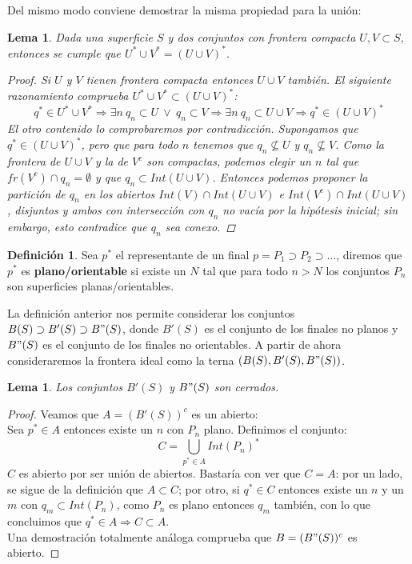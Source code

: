 \documentclass[a4paper,11pt,spanish, twoside, leqno]{tfg-uam}
\newtheorem{lema}[teor]{Lema}
\theoremstyle{definition}
\newtheorem{defin}[teor]{Definici\'on}
\begin{document}
Del mismo modo conviene demostrar la misma propiedad para la unión:
\begin{lema}
Dada una superficie $S$ y dos conjuntos  con frontera compacta $U,V \subset S$, entonces se cumple que $U^*\cup V^* = (U \cup V)^* $.
\begin{proof}
Si $U$ y $V$ tienen frontera compacta entonces $U\cup V$ también. El siguiente razonamiento comprueba $U^*\cup V^* \subset (U \cup V)^* $:
\[
q^* \in U^*\cup V^* \Rightarrow 
\exists n \: q_n \subset U \: \vee \: q_n \subset V \Rightarrow
\exists n \: q_n \subset U \cup V \Rightarrow
q^* \in (U \cup V)^*
\]
El otro contenido lo comprobaremos por contradicción. Supongamos que $q^* \in (U \cup V)^*$, pero que para todo $n$ tenemos que $q_n \nsubseteq U$ y $q_n \nsubseteq V$. Como la frontera de $U \cup V$ y la de $V^c$ son compactas, podemos elegir un $n$ tal que $fr(V^c)\cap q_n = \emptyset$ y que $q_n \subset Int(U\cup V)$. Entonces podemos proponer  la partición de $q_n$ en los abiertos $Int(V) \cap Int(U \cup V)$ e  $Int(V^c) \cap Int(U \cup V)$, disjuntos y ambos con intersección con $q_n$ no vacía por la hipótesis inicial; sin embargo, esto contradice que $q_n$ sea conexo.
\end{proof}
\end{lema}

\begin{defin}
Sea $p^*$ el representante de un final $p =P_1 \supset P_2 \supset \ldots$, diremos que $p^*$ es \textbf{plano/orientable} si existe un $N$ tal que para todo $n>N$ los conjuntos $P_n$ son superficies planas/orientables.
\end{defin}

La definición anterior nos permite considerar los conjuntos $B(S) \supset B'(S) \supset B"(S)$, donde $B'(S)$  es el conjunto de los finales no planos y $B"(S)$ es el conjunto de los finales no orientables. A partir de ahora consideraremos la frontera ideal como la terna $(B(S), B'(S), B"(S))$.
\begin{lema}
Los conjuntos $B'(S)$ y $B"(S)$ son cerrados. 
\end{lema}
\begin{proof}
Veamos que $A = (B'(S))^c$ es un abierto:\\
Sea $p^* \in A$ entonces existe un $n$ con $P_n$ plano. Definimos el conjunto:
\[
C = \bigcup_{p^* \in A} Int(P_n)^*
\]
$C$ es abierto por ser unión de abiertos. Bastaría con ver que $C=A$: por un lado, se sigue de la definición que $A\subset C$; por otro, si $q^* \in C$ entonces existe un $n$ y un $m$ con $q_m \subset Int(P_n)$, como $P_n$ es plano entonces $q_m$ también, con lo que concluimos que $q^* \in A \Rightarrow C\subset A$.\\
Una demostración totalmente análoga comprueba que $B = (B"(S))^c$ es abierto.
\end{proof}
\end{document}
